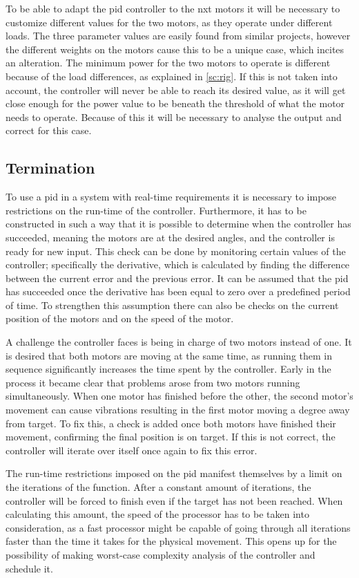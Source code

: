 To be able to adapt the \gls{pid} controller to the \gls{nxt} motors it will be necessary to customize different values for the two motors, as they operate under different loads. The three parameter values are easily found from similar projects, however the different weights on the motors cause this to be a unique case, which incites an alteration. The minimum power for the two motors to operate is different because of the load differences, as explained in \cref{sc:rig}. If this is not taken into account, the controller will never be able to reach its desired value, as it will get close enough for the power value to be beneath the threshold of what the motor needs to operate. Because of this it will be necessary to analyse the output and correct for this case.

\subsection{Termination}
To use a \gls{pid} in a system with real-time requirements it is necessary to impose restrictions on the run-time of the controller. Furthermore, it has to be constructed in such a way that it is possible to determine when the controller has succeeded, meaning the motors are at the desired angles, and the controller is ready for new input. This check can be done by monitoring certain values of the controller; specifically the derivative, which is calculated by finding the difference between the current error and the previous error. It can be assumed that the \gls{pid} has succeeded once the derivative has been equal to zero over a predefined period of time. To strengthen this assumption there can also be checks on the current position of the motors and on the speed of the motor.

A challenge the controller faces is being in charge of two motors instead of one. It is desired that both motors are moving at the same time, as running them in sequence significantly increases the time spent by the controller. Early in the process it became clear that problems arose from two motors running simultaneously. When one motor has finished before the other, the second motor's movement can cause vibrations resulting in the first motor moving a degree away from target. To fix this, a check is added once both motors have finished their movement, confirming the final position is on target. If this is not correct, the controller will iterate over itself once again to fix this error.

The run-time restrictions imposed on the \gls{pid} manifest themselves by a limit on the iterations of the function. After a constant amount of iterations, the controller will be forced to finish even if the target has not been reached. When calculating this amount, the speed of the processor has to be taken into consideration, as a fast processor might be capable of going through all iterations faster than the time it takes for the physical movement. This opens up for the possibility of making worst-case complexity analysis of the controller and schedule it.